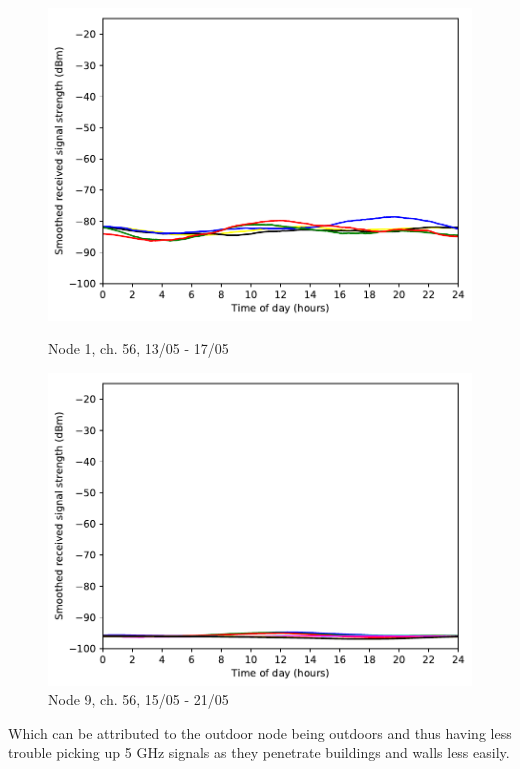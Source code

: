 \documentclass[a4paper, 11pt]{article}
\begin{document}
\begin{figure}[!h]
\begin{minipage}{0.47\textwidth}
	\centering
	\includegraphics[width=\textwidth]{images/5_GHz/node1_2017-05-17_chan56_image.pdf}
	\caption{Node 1, ch. 56, 13/05 - 17/05}
	\label{node1_5ghz_traffic_chan56}
\end{minipage}\hfill
\begin{minipage}{0.47\textwidth}
    \centering
	\includegraphics[width=\textwidth]{images/5_GHz/cot-node9-student_2017-05-21_chan56_image.pdf}
    \caption{Node 9, ch. 56, 15/05 - 21/05} \label{node9_5ghz_traffic_chan56}
\end{minipage}\hfill
\end{figure}
Which can be attributed to the outdoor node being outdoors and thus having less trouble picking up 5 GHz signals as they penetrate buildings and walls less easily.\\  \\
\end{document}
